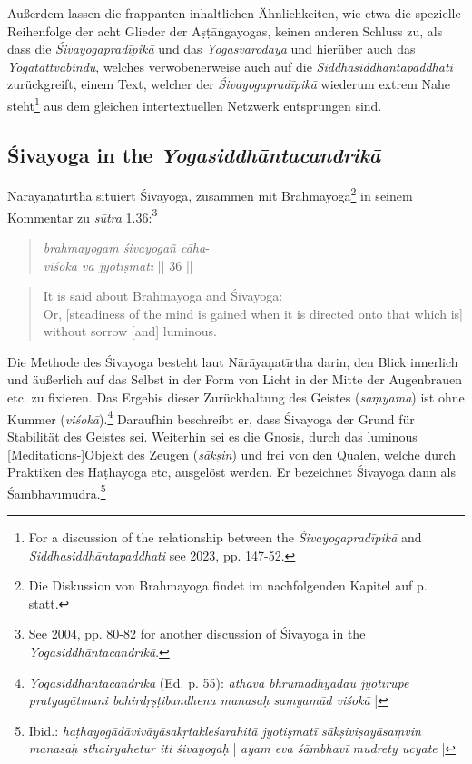   Außerdem lassen die frappanten inhaltlichen Ähnlichkeiten, wie etwa die spezielle Reihenfolge der acht Glieder der Aṣṭāṅgayogas, keinen anderen Schluss zu, als dass die \textit{Śivayogapradīpikā} und das \textit{Yogasvarodaya} und hierüber auch das \textit{Yogatattvabindu}, welches verwobenerweise auch auf die \textit{Siddhasiddhāntapaddhati} zurückgreift, einem Text, welcher der \textit{Śivayogapradīpikā} wiederum extrem Nahe steht\footnote{For a discussion of the relationship between the \textit{Śivayogapradīpikā} and \textit{Siddhasiddhāntapaddhati} see \citeauthor{powell2023} 2023, pp. 147-52.} aus dem gleichen intertextuellen Netzwerk entsprungen sind. 

\subsection{Śivayoga in the \textit{Yogasiddhāntacandrikā}}
\label{sivayogacandri}
Nārāyaṇatīrtha situiert Śivayoga, zusammen mit Brahmayoga\footnote{Die Diskussion von Brahmayoga findet im nachfolgenden Kapitel auf p.\pageref{brahmayogaintro} statt.} in seinem Kommentar zu \textit{sūtra} 1.36:\footnote{See \citeauthor{penna2004} 2004, pp. 80-82 for another discussion of Śivayoga in the \textit{Yogasiddhāntacandrikā}.}

\begin{quote}
\textit{brahmayogaṃ śivayogañ cāha}-\\
\textit{viśokā vā jyotiṣmatī} || 36 ||
\end{quote}
\begin{quote}
It is said about Brahmayoga and Śivayoga: \\
Or, [steadiness of the mind is gained when it is directed onto that which is] without sorrow [and] luminous.  
\end{quote}

Die Methode des Śivayoga besteht laut Nārāyaṇatīrtha darin, den Blick innerlich und äußerlich auf das Selbst in der Form von Licht in der Mitte der Augenbrauen etc. zu fixieren. Das Ergebis dieser Zurückhaltung des Geistes (\textit{saṃyama}) ist ohne Kummer (\textit{viśokā}).\footnote{\textit{Yogasiddhāntacandrikā} (Ed. p. 55): \textit{athavā bhrūmadhyādau jyotīrūpe pratyagātmani bahirdṛṣṭibandhena manasaḥ saṃyamād viśokā} |} Daraufhin beschreibt er, dass Śivayoga der Grund für Stabilität des Geistes sei. Weiterhin sei es die Gnosis, durch das luminous [Meditations-]Objekt des Zeugen (\textit{sākṣin}) und frei von den Qualen, welche durch Praktiken des Haṭhayoga etc, ausgelöst werden. Er bezeichnet Śivayoga dann als Śāmbhavīmudrā.\footnote{Ibid.: \textit{haṭhayogādāvivāyāsakṛtakleśarahitā jyotiṣmatī sākṣiviṣayāsaṃvin manasaḥ sthairyahetur iti śivayogaḥ} | \textit{ayam eva śāmbhavī mudrety ucyate} |}

